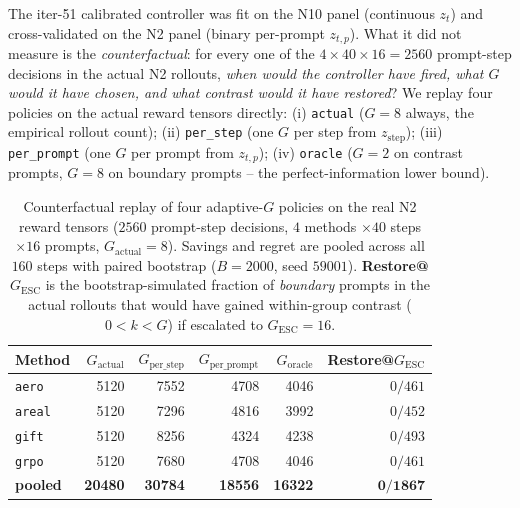 \documentclass{article}
\begin{document}
The iter-51 calibrated controller was fit on the N10 panel
(continuous $z_t$) and cross-validated on the N2 panel
(binary per-prompt $z_{t,p}$). What it did not measure is the
\emph{counterfactual}: for every one of the
$4 \times 40 \times 16 = 2560$ prompt-step decisions in the actual
N2 rollouts, \emph{when would the controller have fired, what $G$
would it have chosen, and what contrast would it have restored}?
We replay four policies on the actual reward tensors directly:
(i) \texttt{actual} ($G=8$ always, the empirical rollout count);
(ii) \texttt{per\_step} (one $G$ per step from $z_{\mathrm{step}}$);
(iii) \texttt{per\_prompt} (one $G$ per prompt from $z_{t,p}$);
(iv) \texttt{oracle} ($G=2$ on contrast prompts, $G=8$ on boundary
prompts -- the perfect-information lower bound).

\begin{table}[t]
\centering
\caption{Counterfactual replay of four adaptive-$G$ policies on the
real N2 reward tensors ($2560$ prompt-step decisions, $4$ methods
$\times 40$ steps $\times 16$ prompts, $G_{\mathrm{actual}}=8$).
Savings and regret are pooled across all $160$ steps with paired
bootstrap ($B{=}2000$, seed $59001$). \textbf{Restore@$G_{\mathrm{ESC}}$}
is the bootstrap-simulated fraction of \emph{boundary} prompts in
the actual rollouts that would have gained within-group contrast
($0 < k < G$) if escalated to $G_{\mathrm{ESC}}{=}16$.
\label{tab:p7-cf-granularity}}
\begin{tabular}{lrrrrr}
\toprule
Method & $G_{\mathrm{actual}}$ & $G_{\mathrm{per\_step}}$ & $G_{\mathrm{per\_prompt}}$ & $G_{\mathrm{oracle}}$ & Restore@$G_{\mathrm{ESC}}$ \\
\midrule
\texttt{aero}   & 5120 & 7552 & 4708 & 4046 & $0/461$ \\
\texttt{areal}  & 5120 & 7296 & 4816 & 3992 & $0/452$ \\
\texttt{gift}   & 5120 & 8256 & 4324 & 4238 & $0/493$ \\
\texttt{grpo}   & 5120 & 7680 & 4708 & 4046 & $0/461$ \\
\midrule
\textbf{pooled} & \textbf{20480} & \textbf{30784} & \textbf{18556} & \textbf{16322} & $\mathbf{0/1867}$ \\
\bottomrule
\end{tabular}
\end{table}
\end{document}

